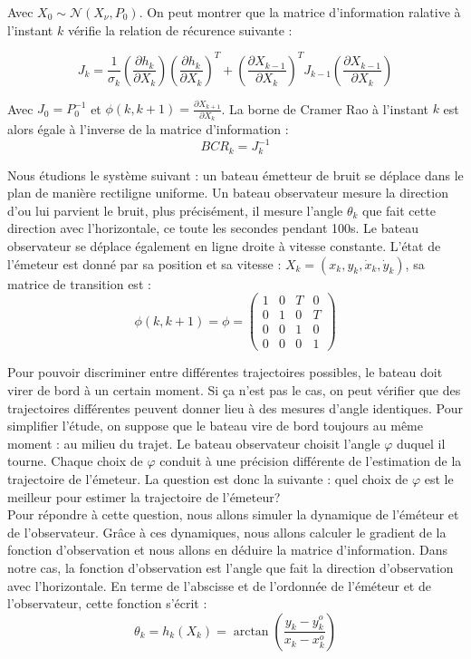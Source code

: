 \documentclass{article}
\begin{document}
Avec $X_{0} \sim  \mathcal{N} (X_{\nu},P_{0})$. On peut montrer que la matrice d'information ralative à l'instant $k$ vérifie
la relation de récurence suivante : 

\[ J_{k} = \frac{1}{\sigma_{k}}\left(\frac{\partial h_{k}}{\partial X_{k}}\right)\left(\frac{\partial h_{k}}{\partial X_{k}}\right)^{T}+\left(\frac{\partial X_{k-1}}{\partial X_{k}}\right)^{T}J_{k-1}\left(\frac{\partial X_{k-1}}{\partial X_{k}}\right)\]

Avec $J_{0}=P_{0}^{-1}$ et $\phi(k,k+1)=\frac{\partial X_{k+1}}{\partial X_{k}}$.
La borne de Cramer Rao à l'instant $k$ est alors égale à l'inverse de la matrice d'information : 
\[BCR_{k}= J_{k}^{-1}\]

Nous étudions le système suivant : un bateau émetteur de bruit se déplace dans le plan de manière rectiligne uniforme. 
Un bateau observateur mesure la direction d'ou lui parvient le bruit, plus précisément, il mesure l'angle $\theta_{k}$ que fait cette direction avec l'horizontale, ce toute les secondes pendant 100s. Le bateau observateur se déplace également en ligne droite à vitesse constante.
L'état de l'émeteur est donné par sa position et sa vitesse : $X_{k} = (x_{k},y_{k},\dot{x}_{k},\dot{y}_{k})$, sa matrice de transition est :
\[\phi(k,k+1) = \phi =  \begin{pmatrix}
  1 & 0 & T & 0 \\
  0 & 1 & 0 & T \\
  0 & 0 & 1 & 0 \\
  0 & 0 & 0 & 1 
  \end{pmatrix}\]

Pour pouvoir discriminer entre différentes
trajectoires possibles, le bateau doit virer de bord à un certain moment. Si ça n'est pas le cas, on peut vérifier que des trajectoires différentes peuvent donner lieu à des mesures d'angle identiques.
Pour simplifier l'étude, on suppose que le bateau vire de bord toujours au même moment : au milieu du trajet. Le bateau observateur choisit l'angle $\varphi $ duquel il tourne. Chaque choix de $\varphi$ 
conduit à une précision différente de l'estimation de la trajectoire  de l'émeteur.
La question est donc la suivante : quel choix de $\varphi$ est le meilleur pour estimer la trajectoire de l'émeteur?
\\
Pour répondre à cette question, nous allons simuler la dynamique de l'éméteur et de l'observateur. Grâce à ces dynamiques, nous allons
calculer le gradient de la fonction d'observation et nous allons en déduire la matrice d'information.
Dans notre cas, la fonction d'observation est l'angle que fait la direction d'observation avec l'horizontale. 
En terme de l'abscisse et de l'ordonnée de l'éméteur et de l'observateur, cette fonction s'écrit : 
\[\theta_{k} = h_{k}(X_{k})=\arctan \left(\frac{y_{k}-y_{k}^{o}}{x_{k}-x_{k}^{o}}\right)\]
\end{document}
